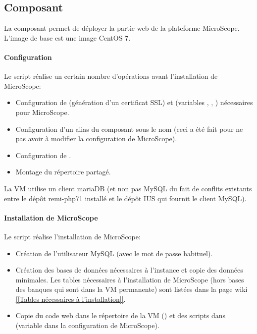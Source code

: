 \subsection {Composant }\label{frontend}

La composant  permet de déployer la partie web de la plateforme MicroScope.
L'image de base est une image CentOS 7.

\paragraph*{Configuration}

Le script  réalise un certain nombre d'opérations avant l'installation de MicroScope:
\begin{itemize}
    \item Configuration de  (génération d'un certificat SSL)
          et  (variables , ,  )
          nécessaires pour MicroScope.
    \item Configuration d'un alias du composant  sous le nom 
          (ceci a été fait pour ne pas avoir à modifier la configuration de MicroScope).
    \item Configuration de .
    \item Montage du répertoire partagé.
\end{itemize}

\begin{mycolorbox}
    La VM  utilise un client mariaDB (et non pas MySQL du fait de conflits existants entre le dépôt remi-php71 installé et le dépôt IUS qui fournit le client MySQL).
\end{mycolorbox}

\paragraph*{Installation de MicroScope}

Le script  réalise l'installation de MicroScope:
\begin{itemize}
    \item Création de l'utilisateur MySQL  (avec le mot de passe habituel).
    \item Création des bases de données nécessaires à l'instance et copie des données minimales.
          Les tables nécessaires à l'installation de MicroScope (hors bases des banques qui sont dans la VM permanente)
          sont listées dans la page wiki           \href{https://intranet.genoscope.cns.fr/agc/redmine/projects/microcloud/wiki/Tables_necessaires_a_installation}{[[Tables nécessaires à l'installation]]}.
    \item Copie du code web dans le répertoire  de la VM ()
          et des scripts dans  (variable  dans la configuration de MicroScope).
\end{itemize}

